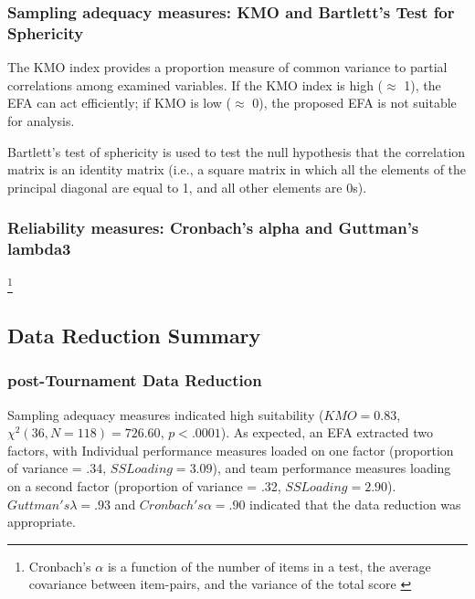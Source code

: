 {\subsubsection{\label{app5:samplingAdequacy}Sampling adequacy measures: KMO and Bartlett's Test for Sphericity}

The KMO index provides a proportion measure of common variance to partial correlations among examined variables.  If the KMO index is high ($\approx$ 1), the EFA can act efficiently; if KMO is low ($\approx$ 0), the proposed EFA is not suitable for analysis.

Bartlett’s test of sphericity is used to test the null hypothesis that the correlation matrix is an identity matrix (i.e., a square matrix in which all the elements of the principal diagonal are equal to 1, and all other elements are 0s).

\subsubsection{\label{app5:reliabilityMeasures}Reliability measures: Cronbach's alpha and Guttman's lambda3}


\footnote{Cronbach's $\alpha$ is a function of the number of items in a test, the average covariance between item-pairs, and the variance of the total score \citep{Tabachnick2007}}








\subsection{Data Reduction Summary}


\subsubsection{post-Tournament Data Reduction}

Sampling adequacy measures indicated high suitability ($KMO = 0.83$, $\chi^2(36, N = 118) = 726.60$, $p < .0001$).  As expected, an EFA extracted two factors, with Individual performance measures loaded on one factor (proportion of variance = .34, $SS Loading = 3.09$), and team performance measures loading on a second factor (proportion of variance = .32, $SS Loading = 2.90$). $Guttman's \lambda =.93$ and $Cronbach's \alpha = .90$ indicated that the data reduction was appropriate.





}
